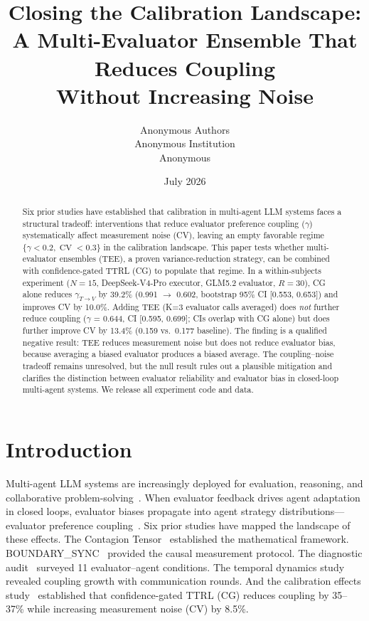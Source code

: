 \documentclass[11pt]{article}
\title{Closing the Calibration Landscape: \\ A Multi-Evaluator Ensemble That Reduces Coupling \\ Without Increasing Noise}
\author{
  Anonymous Authors \\
  Anonymous Institution \\
  Anonymous
}
\date{July 2026}
\DeclareMathOperator{\CV}{CV}
\begin{document}
\maketitle

\begin{abstract}
Six prior studies have established that calibration in multi-agent LLM systems faces a structural tradeoff: interventions that reduce evaluator preference coupling ($\gamma$) systematically affect measurement noise (CV), leaving an empty favorable regime $\{\gamma < 0.2, \CV < 0.3\}$ in the calibration landscape. This paper tests whether multi-evaluator ensembles (TEE), a proven variance-reduction strategy, can be combined with confidence-gated TTRL (CG) to populate that regime. In a within-subjects experiment ($N{=}15$, DeepSeek-V4-Pro executor, GLM5.2 evaluator, $R{=}30$), CG alone reduces $\gamma_{T\to V}$ by 39.2\% (0.991 $\to$ 0.602, bootstrap 95\% CI [0.553, 0.653]) and improves CV by 10.0\%. Adding TEE (K=3 evaluator calls averaged) does \textit{not} further reduce coupling ($\gamma$ = 0.644, CI [0.595, 0.699]; CIs overlap with CG alone) but does further improve CV by 13.4\% (0.159 vs.\ 0.177 baseline). The finding is a qualified negative result: TEE reduces measurement noise but does not reduce evaluator bias, because averaging a biased evaluator produces a biased average. The coupling--noise tradeoff remains unresolved, but the null result rules out a plausible mitigation and clarifies the distinction between evaluator reliability and evaluator bias in closed-loop multi-agent systems. We release all experiment code and data.
\end{abstract}

\newpage

\section{Introduction}

Multi-agent LLM systems are increasingly deployed for evaluation, reasoning, and collaborative problem-solving~\cite{zheng2023judging,chiang2024chatbot,li2023camel,wu2024autogen,snell2024scaling}. When evaluator feedback drives agent adaptation in closed loops, evaluator biases propagate into agent strategy distributions---evaluator preference coupling~\cite{liu2026epc}. Six prior studies have mapped the landscape of these effects. The Contagion Tensor~\cite{liu2026tensor} established the mathematical framework. BOUNDARY\_SYNC~\cite{liu2026boundarysync} provided the causal measurement protocol. The diagnostic audit~\cite{liu2026audit} surveyed 11 evaluator--agent conditions. The temporal dynamics study~\cite{liu2026temporal} revealed coupling growth with communication rounds. And the calibration effects study~\cite{liu2026caleffects} established that confidence-gated TTRL (CG) reduces coupling by 35--37\% while increasing measurement noise (CV) by 8.5\%.
\end{document}
